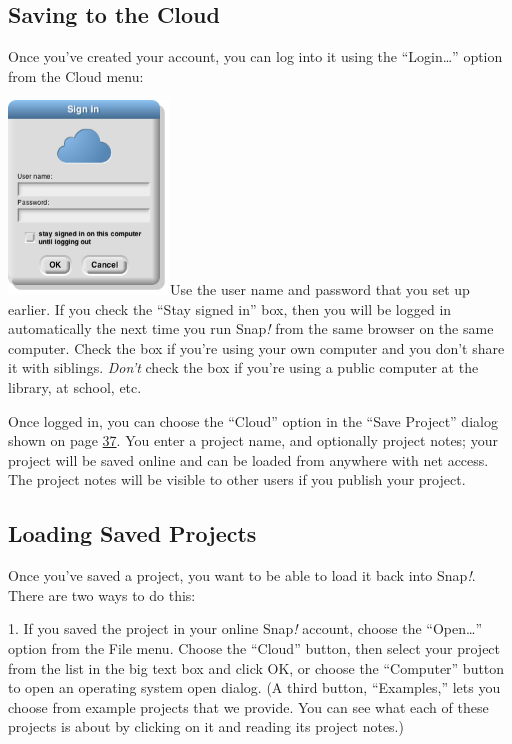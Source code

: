 \subsection{Saving to the Cloud}\label{saving-to-the-cloud}

Once you've created your account, you can log into it using the
``Login\ldots'' option from the Cloud menu:

\includegraphics[width=1.6875in,height=2.02778in]{media/image490.png}Use
the user name and password that you set up earlier. If you check the
``Stay signed in'' box, then you will be logged in automatically the
next time you run Snap\emph{!} from the same browser on the same
computer. Check the box if you're using your own computer and you don't
share it with siblings. \emph{Don't} check the box if you're using a
public computer at the library, at school, etc.

Once logged in, you can choose the ``Cloud'' option in the ``Save
Project'' dialog shown on page \hyperref[saveas]{37}. You enter a
project name, and optionally project notes; your project will be saved
online and can be loaded from anywhere with net access. The project
notes will be visible to other users if you publish your project.

\subsection{Loading Saved Projects}\label{loading-saved-projects}

Once you've saved a project, you want to be able to load it back into
Snap\emph{!}. There are two ways to do this:

1. If you saved the project in your online Snap\emph{!} account, choose
the ``Open\ldots'' option from the File menu. Choose the ``Cloud''
button, then select your project from the list in the big text box and
click OK, or choose the ``Computer'' button to open an operating system
open dialog. (A third button, ``Examples,'' lets you choose from example
projects that we provide. You can see what each of these projects is
about by clicking on it and reading its project notes.)

